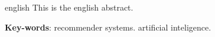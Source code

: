 \begin{resumo}[Abstract]
 \begin{otherlanguage*}{english}
   This is the english abstract.

   \vspace{\onelineskip}
 
   \noindent 
   \textbf{Key-words}: recommender systems. artificial inteligence.
 \end{otherlanguage*}
\end{resumo}
